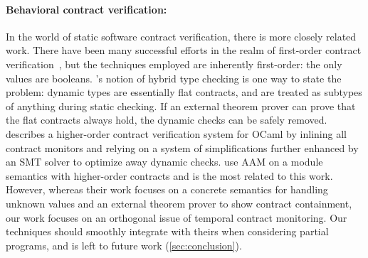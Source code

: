 \paragraph{Behavioral contract verification:}
In the world of static software contract verification, there is more closely related work.
%
There have been many successful efforts in the realm of first-order contract verification~\citep{ianjohnson:fahndrich:contracts:2011,ianjohnson:vcc:2009}, but the techniques employed are inherently first-order: the only values are booleans.
%
\citet{ianjohnson:Flanagan:2006:HTC:1111037.1111059}'s notion of hybrid type checking is one way to state the problem: dynamic types are essentially flat contracts, and are treated as subtypes of anything during static checking.
%
If an external theorem prover can prove that the flat contracts always hold, the dynamic checks can be safely removed.
%
\citet{dvanhorn:Xu2012Hybrid} describes a higher-order contract verification system for OCaml by inlining all contract monitors and relying on a system of simplifications further enhanced by an SMT solver to optimize away dynamic checks.
%
\citet{dvanhorn:TobinHochstadt2012Higherorder} use AAM on a module semantics with higher-order contracts and is the most related to this work.
%
However, whereas their work focuses on a concrete semantics for handling unknown values and an external theorem prover to show contract containment, our work focuses on an orthogonal issue of temporal contract monitoring.
%
Our techniques should smoothly integrate with theirs when considering partial programs, and is left to future work (\cref{sec:conclusion}).
